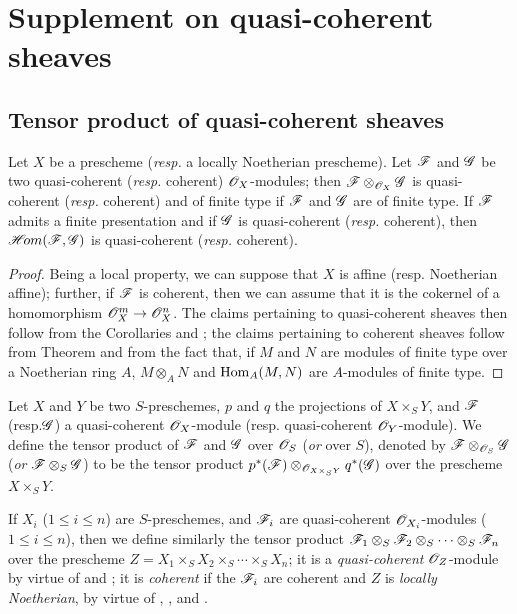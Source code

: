 \section{Supplement on quasi-coherent sheaves}
\label{section-supplement-on-qcoh}

\subsection{Tensor product of quasi-coherent sheaves}
\label{subsection-tensor-product-of-qcoh}

\begin{prop}[9.1.1]
\label{1.9.1.1}
Let $X$ be a prescheme (\emph{resp.} a locally Noetherian prescheme). Let $\mathscr{F}$ and
$\mathscr{G}$ be two quasi-coherent (\emph{resp.} coherent) $\mathscr{O}_X$-modules; then
$\mathscr{F}\otimes_{\mathscr{O}_X}\mathscr{G}$ is quasi-coherent (\emph{resp.} coherent) and
of finite type if $\mathscr{F}$ and $\mathscr{G}$ are of finite type. If
$\mathscr{F}$ admits a finite presentation and if $\mathscr{G}$ is quasi-coherent
(\emph{resp.} coherent), then $\mathscr{H}\!{om}(\mathscr{F},\mathscr{G})$ is quasi-coherent
(\emph{resp.} coherent).
\end{prop}

\begin{proof}
\label{proof-1.9.1.1}
Being a local property, we can suppose that $X$ is affine (resp. Noetherian
affine); further, if $\mathscr{F}$ is coherent, then we can assume that it is the
cokernel of a homomorphism $\OO_X^m\to\OO_X^n$. The claims pertaining to
quasi-coherent sheaves then follow from the Corollaries  and ; the
claims pertaining to coherent sheaves follow from Theorem  and from the fact
that, if $M$ and $N$ are modules of finite type over a Noetherian ring $A$,
$M\otimes_A N$ and ${\mathop{\mathrm{Hom}}\nolimits}_A(M,N)$ are $A$-modules of finite type.
\end{proof}

\begin{defn}[9.1.2]
\label{1.9.1.2}
Let $X$ and $Y$ be two $S$-preschemes, $p$ and
$q$ the projections of $X\times_S Y$, and $\mathscr{F}$ (resp.$\mathscr{G}$) a
quasi-coherent $\mathscr{O}_X$-module (resp. quasi-coherent $\mathscr{O}_Y$-module). We define the
tensor product of $\mathscr{F}$ and $\mathscr{G}$ over $\mathscr{O}_S$ (\emph{or} over $S$),
denoted by $\mathscr{F}\otimes_{\mathscr{O}_S}\mathscr{G}$ (\emph{or}
$\mathscr{F}\otimes_S\mathscr{G}$) to be the tensor product
$p^*(\mathscr{F})\otimes_{\mathscr{O}_{X\times_S Y}}q^*(\mathscr{G})$ over the
prescheme $X\times_S Y$.
\end{defn}

If $X_i$ ($1\leqslant i\leqslant n$) are $S$-preschemes, and $\mathscr{F}_i$ are quasi-coherent
$\mathscr{O}_{X_i}$-modules ($1\leqslant i\leqslant n$), then we define similarly the tensor product
$\mathscr{F}_1\otimes_S\mathscr{F}_2\otimes_S\cdots\otimes_S\mathscr{F}_n$ over the
prescheme $Z=X_1\times_S X_2\times_S\cdots\times_S X_n$; it is a
\emph{quasi-coherent} $\mathscr{O}_Z$-module by virtue of  and
; it is \emph{coherent} if the $\mathscr{F}_i$ are coherent and
$Z$ is \emph{locally Noetherian}, by virtue of ,
, and .

